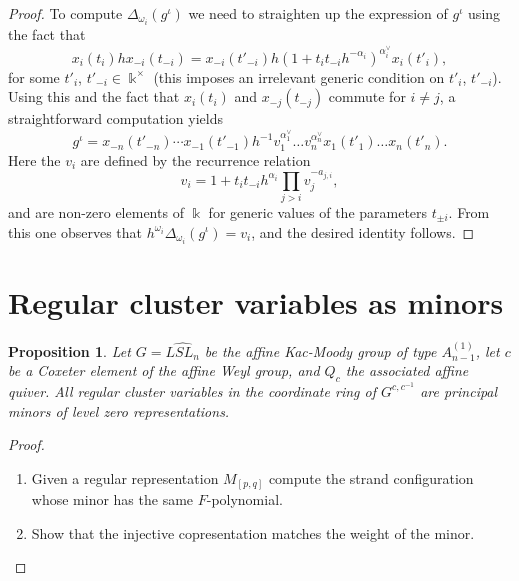 \documentclass[12pt]{amsart}
\newcommand{\kk}{\Bbbk}%
\newtheorem{proposition}[theorem]{Proposition}
\theoremstyle{remark}
\numberwithin{equation}{section}
\begin{document}
\begin{proof}
  To compute $\Delta_{\omega_i}(g^\iota)$ we need to straighten up the expression of $g^\iota$ using the fact that %
  \begin{equation*}
    x_i(t_i) h x_{-i}(t_{-i})
    =
    x_{-i}(t'_{-i})
    h
    (1+t_it_{-i}h^{-\alpha_i})^{\alpha_i^\vee}
    x_{i}(t'_i),
  \end{equation*}
  for some $t'_i$, $t'_{-i} \in \kk^\times$ \cite[Proposition 7.2]{BZ01} (this imposes an irrelevant generic condition on $t'_i$, $t'_{-i}$).
  Using this and the fact that $x_i(t_i)$ and $x_{-j}(t_{-j})$ commute for $i \neq j$, a straightforward computation yields
  \[
    g^\iota 
    = 
    x_{-n}(t'_{-n})
    \cdots
    x_{-1}(t'_{-1})
    h^{-1}
    v_1^{\alpha^\vee_1}
    \dots
    v_n^{\alpha^\vee_n}
    x_1(t'_1)
    \dots
    x_n(t'_n).
  \]
  Here the $v_i$ are defined by the recurrence relation
  \[
    v_i 
    = 
    1 + t_i t_{-i} h^{\alpha_i}
    \prod_{j > i} v_j^{-a_{j,i}},
  \]
and are non-zero elements of $\kk$ for generic values of the parameters $t_{\pm i}$. From this one observes that $h^{\omega_i}\Delta_{\omega_i}(g^\iota) = v_i$, and the desired identity follows.
\end{proof}

\section{Regular cluster variables as minors}

\begin{proposition}\label{prop:level zero}
Let $G = \widehat{LSL_n}$ be the affine Kac-Moody group of type $A_{n-1}^{(1)}$, let $c$ be a Coxeter element of the affine Weyl group, and $Q_c$ the associated affine quiver.  All regular cluster variables in the coordinate ring of $G^{c,c^{-1}}$ are principal minors of level zero representations.  
\end{proposition}
\begin{proof}
\begin{enumerate}
\item Given a regular representation $M_{[p,q]}$ compute the strand configuration whose minor has the same $F$-polynomial.
\item Show that the injective copresentation matches the weight of the minor.
\end{enumerate}
\end{proof}
\end{document}
